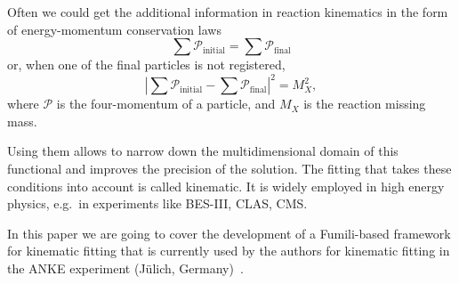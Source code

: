 Often we could get the additional information in reaction kinematics in the form of energy-momentum conservation laws
\begin{equation}
\label{cons_full}
\sum\mathcal{P}_\mathrm{initial} = \sum\mathcal{P}_\mathrm{final}
\end{equation}
or, when one of the final particles is not registered,
\begin{equation}
\label{cons_miss}
\displaystyle\left|\sum\mathcal{P}_\mathrm{initial} - \sum\mathcal{P}_\mathrm{final}\right|^2 = M_X^2,
\end{equation}
where $\mathcal{P}$ is the four-momentum of a particle, and $M_X$ is the reaction missing mass.

Using them allows to narrow down the multidimensional domain of this functional and improves the precision of the solution.
The fitting that takes these conditions into account is called kinematic.
It is widely employed in high energy physics, e.g.\ in experiments like 
BES-III, %
CLAS, %
CMS. %

In this paper we are going to cover the development of a Fumili-based framework for kinematic fitting that is currently used by the authors for kinematic fitting in the ANKE experiment (Jülich, Germany)~\cite{anke}.
